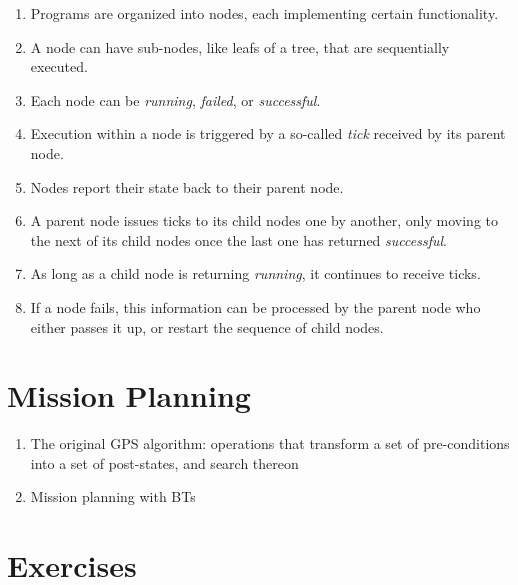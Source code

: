 \begin{enumerate}
\item Programs are organized into nodes, each implementing certain functionality.
\item A node can have sub-nodes, like leafs of a tree, that are sequentially executed.
\item Each node can be \emph{running}, \emph{failed}, or \emph{successful}.
\item Execution within a node is triggered by a so-called \emph{tick} received by its parent node.
\item Nodes report their state back to their parent node.
\item A parent node issues ticks to its child nodes one by another, only moving to the next of its child nodes once the last one has returned \emph{successful}.
\item As long as a child node is returning \emph{running}, it continues to receive ticks.
\item If a node fails, this information can be processed by the parent node who either passes it up, or restart the sequence of child nodes.
\end{enumerate}

\section{Mission Planning}\label{sec:strips}
\begin{enumerate}
\item The original GPS algorithm: operations that transform a set of pre-conditions into a set of post-states, and search thereon
\item Mission planning with BTs
\end{enumerate}

\section{Exercises}

